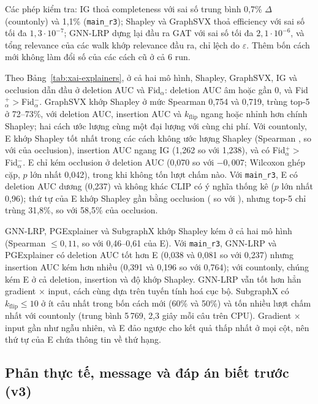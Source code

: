 Các phép kiểm tra: IG thoả completeness với sai số trung bình 0,7\% $\Delta$ (countonly) và 1,1\% (\texttt{main\_r3}); Shapley và GraphSVX thoả efficiency với sai số tối đa $1{,}3\cdot10^{-7}$; GNN-LRP dựng lại đầu ra GAT với sai số tối đa $2{,}1\cdot10^{-6}$, và tổng relevance của các walk khớp relevance đầu ra, chỉ lệch do $\varepsilon$.
Thêm bốn cách mới không làm đổi số của các cách cũ ở cả 6 run.

Theo Bảng~\ref{tab:xai-explainers}, ở cả hai mô hình, Shapley, GraphSVX, IG và occlusion dẫn đầu ở deletion AUC và Fid$_{\alpha}$: deletion AUC âm hoặc gần 0, và Fid$_{\alpha}^{+}>{}$Fid$_{\alpha}^{-}$.
GraphSVX khớp Shapley ở mức Spearman 0,754 và 0,719, trùng top-5 ở 72--73\%, với deletion AUC, insertion AUC và $k_{\text{flip}}$ ngang hoặc nhỉnh hơn chính Shapley; hai cách ước lượng cùng một đại lượng với cùng chi phí.
Với countonly, E khớp Shapley tốt nhất trong các cách không ước lượng Shapley (Spearman , so với  của occlusion), insertion AUC ngang IG (1,262 so với 1,238), và có Fid$_{\alpha}^{+}>{}$Fid$_{\alpha}^{-}$.
E chỉ kém occlusion ở deletion AUC (0,070 so với $-0{,}007$; Wilcoxon ghép cặp, $p$ lớn nhất 0,042), trong khi không tốn lượt chấm nào.
Với \texttt{main\_r3}, E có deletion AUC dương (0,237) và không khác CLIP có ý nghĩa thống kê ($p$ lớn nhất 0,96); thứ tự của E khớp Shapley gần bằng occlusion ( so với ), nhưng top-5 chỉ trùng 31,8\%, so với 58,5\% của occlusion.

GNN-LRP, PGExplainer và SubgraphX khớp Shapley kém ở cả hai mô hình (Spearman $\le 0{,}11$, so với 0,46--0,61 của E).
Với \texttt{main\_r3}, GNN-LRP và PGExplainer có deletion AUC tốt hơn E (0,038 và 0,081 so với 0,237) nhưng insertion AUC kém hơn nhiều (0,391 và 0,196 so với 0,764); với countonly, chúng kém E ở cả deletion, insertion và độ khớp Shapley.
GNN-LRP vẫn tốt hơn hẳn gradient $\times$ input, cách cùng dựa trên tuyến tính hoá cục bộ.
SubgraphX có $k_{\text{flip}}\le 10$ ở ít câu nhất trong bốn cách mới (60\% và 50\%) và tốn nhiều lượt chấm nhất với countonly (trung bình 5\,769, 2,3 giây mỗi câu trên CPU).
Gradient $\times$ input gần như ngẫu nhiên, và E đảo ngược cho kết quả thấp nhất ở mọi cột, nên thứ tự của E chứa thông tin về thứ hạng.

\subsection{Phản thực tế, message và đáp án biết trước (v3)}\label{sec:xai-v3}


